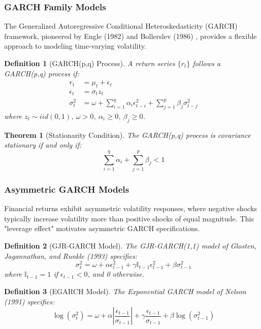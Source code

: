 \documentclass[12pt,a4paper]{article}
\newtheorem{theorem}{Theorem}
\newtheorem{definition}{Definition}
\begin{document}
\subsubsection{GARCH Family Models}

The Generalized Autoregressive Conditional Heteroskedasticity (GARCH) framework, pioneered by Engle (1982) \cite{engle1982autoregressive} and Bollerslev (1986) \cite{bollerslev1986generalized}, provides a flexible approach to modeling time-varying volatility.

\begin{definition}[GARCH(p,q) Process]
A return series $\{r_t\}$ follows a GARCH(p,q) process if:
\begin{align}
r_t &= \mu_t + \epsilon_t \\
\epsilon_t &= \sigma_t z_t \\
\sigma_t^2 &= \omega + \sum_{i=1}^{q} \alpha_i \epsilon_{t-i}^2 + \sum_{j=1}^{p} \beta_j \sigma_{t-j}^2
\end{align}
where $z_t \sim iid(0,1)$, $\omega > 0$, $\alpha_i \geq 0$, $\beta_j \geq 0$.
\end{definition}

\begin{theorem}[Stationarity Condition]
The GARCH(p,q) process is covariance stationary if and only if:
$$\sum_{i=1}^{q} \alpha_i + \sum_{j=1}^{p} \beta_j < 1$$
\end{theorem}

\subsubsection{Asymmetric GARCH Models}

Financial returns exhibit asymmetric volatility responses, where negative shocks typically increase volatility more than positive shocks of equal magnitude. This "leverage effect" motivates asymmetric GARCH specifications.

\begin{definition}[GJR-GARCH Model]
The GJR-GARCH(1,1) model of Glosten, Jagannathan, and Runkle (1993) \cite{glosten1993relation} specifies:
$$\sigma_t^2 = \omega + \alpha \epsilon_{t-1}^2 + \gamma \mathbb{I}_{t-1} \epsilon_{t-1}^2 + \beta \sigma_{t-1}^2$$
where $\mathbb{I}_{t-1} = 1$ if $\epsilon_{t-1} < 0$, and 0 otherwise.
\end{definition}

\begin{definition}[EGARCH Model]
The Exponential GARCH model of Nelson (1991) \cite{nelson1991conditional} specifies:
$$\log(\sigma_t^2) = \omega + \alpha \left| \frac{\epsilon_{t-1}}{\sigma_{t-1}} \right| + \gamma \frac{\epsilon_{t-1}}{\sigma_{t-1}} + \beta \log(\sigma_{t-1}^2)$$
\end{definition}
\end{document}
